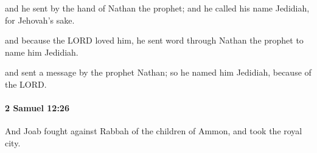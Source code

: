 			\begin{versebox}
					\item[BHS] 
					\item[ASV] and he sent by the hand of Nathan the prophet; and he called his name Jedidiah, for Jehovah's sake.
					\item[NIV] and because the LORD loved him, he sent word through Nathan the prophet to name him Jedidiah.
					\item[NRSV] and sent a message by the prophet Nathan; so he named him Jedidiah, because of the LORD.
			\end{versebox}

		\paragraph{2 Samuel 12:26} %
			\label{2SAMUEL-12-26}

			And Joab fought against Rabbah of the children of Ammon, and took the royal city.

